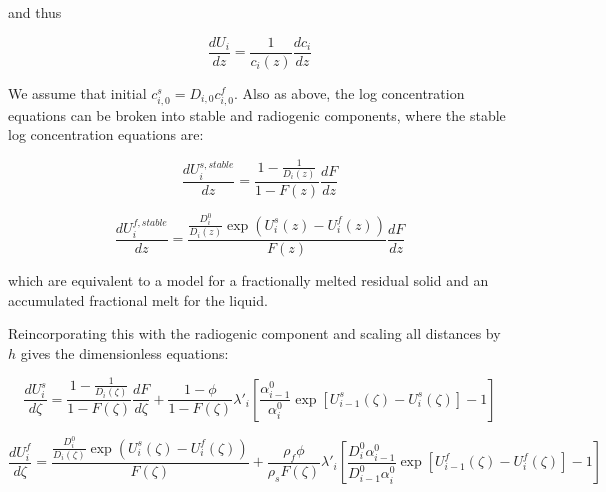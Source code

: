 \documentclass[draft]{agujournal2019}
\begin{document}
and thus

\begin{linenomath*}
\begin{equation}
    \frac{dU_i}{dz} = \frac{1}{c_i(z)} \frac{dc_i}{dz}\label{eq:24}
\end{equation}
\end{linenomath*}

We assume that initial $c_{i,0}^s = D_{i,0} c_{i,0}^f$. Also as above, the log concentration equations can be broken into stable and radiogenic components, where the stable log concentration equations are:

\begin{linenomath*}
\begin{equation}
    \frac{dU_{i}^{s,stable}}{dz} = \frac{1-\frac{1}{D_i(z)}}{1-F(z)} \frac{dF}{dz}\label{eq:25}
\end{equation}
\end{linenomath*}

\begin{linenomath*}
\begin{equation}
    \frac{dU_{i}^{f,stable}}{dz} = \frac{\frac{D_i^0}{D_i(z)} \exp(U_i^s(z)-U_i^f(z))}{F(z)}  \frac{dF}{dz}\label{eq:26}
\end{equation}
\end{linenomath*}

which are equivalent to a model for a fractionally melted residual solid and an accumulated fractional melt for the liquid.

Reincorporating this with the radiogenic component and scaling all distances by $h$ gives the dimensionless equations:

\begin{linenomath*}
\begin{equation}
    \frac{dU_{i}^{s}}{d\zeta} = \frac{1-\frac{1}{D_i(\zeta)}}{1-F(\zeta)} \frac{dF}{d\zeta} + \frac{1-\phi}{1-F(\zeta)}\lambda'_i \left[\frac{\alpha_{i-1}^0}{\alpha_i^0} \exp[U_{i-1}^s(\zeta) - U_i^s(\zeta)]-1\right]\label{eq:27}
\end{equation}
\end{linenomath*}

\begin{linenomath*}
\begin{equation}
    \frac{dU_{i}^{f}}{d\zeta} = \frac{\frac{D_i^0}{D_i(\zeta)} \exp(U_i^s(\zeta)-U_i^f(\zeta))}{F(\zeta)} + \frac{\rho_f \phi}{\rho_s F(\zeta)}\lambda'_i \left[\frac{D_i^0 \alpha_{i-1}^0}{D_{i-1}^0 \alpha_i^0} \exp[U_{i-1}^f(\zeta) - U_i^f(\zeta)]-1\right]\label{eq:28}
\end{equation}
\end{linenomath*}
\end{document}
